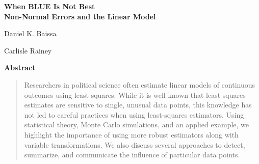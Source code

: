 \documentclass[12pt]{article}
\begin{document}
\begin{center}
{\LARGE \textbf{When BLUE Is Not Best}}\\\vspace{2mm}
{ \textbf{Non-Normal Errors and the Linear Model}}\\\vspace{2mm}


\vspace{10mm}

Daniel K. Baissa

\vspace{3mm}

Carlisle Rainey
\end{center}

\vspace{10mm}

{\centerline{\textbf{Abstract}}}
\begin{quote}\noindent
Researchers in political science often estimate linear models of continuous outcomes using least squares. 
While it is well-known that least-squares estimates are sensitive to single, unusual data points, this knowledge has not led to careful practices when using least-squares estimators. 
Using statistical theory, Monte Carlo simulations, and an applied example, we highlight the importance of using more robust estimators along with variable transformations.
We also discuss several approaches to detect, summarize, and communicate the influence of particular data points. 
 \end{quote}


\end{document}
